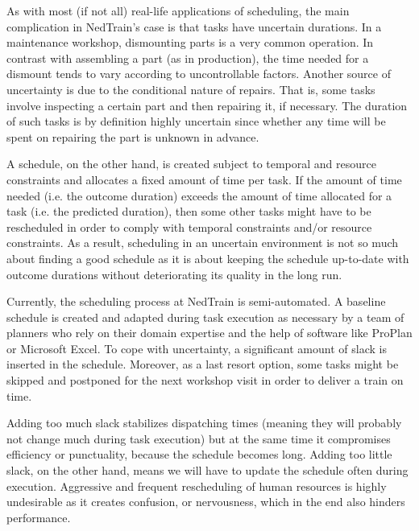 		As with most (if not all) real-life applications of scheduling,
		the main complication in NedTrain's case is that tasks have uncertain durations.
		In a maintenance workshop, dismounting parts is a very common operation.
		In contrast with assembling a part (as in production), the time needed for a dismount tends to vary according to uncontrollable factors.
		Another source of uncertainty is due to the conditional nature of repairs.
		That is, some tasks involve inspecting a certain part and then repairing it, if necessary.
		The duration of such tasks is by definition highly uncertain since whether 
		any time will be spent on repairing the part is unknown in advance.

		A schedule, on the other hand, is created subject to temporal and resource constraints and allocates a fixed amount of time per task.
		If the amount of time needed (i.e. the outcome duration) exceeds the amount of time allocated for a task (i.e. the predicted duration),
		then some other tasks might have to be rescheduled in order to comply with temporal constraints and/or resource constraints.
		As a result, scheduling in an uncertain environment is not so much about finding a good schedule 
		as it is about keeping the schedule up-to-date with outcome durations without deteriorating its quality in the long run.

		Currently, the scheduling process at NedTrain is semi-automated.
		A baseline schedule is created and adapted during task execution as necessary by a team of 
		planners who rely on their domain expertise and the help of software like ProPlan or Microsoft Excel.
		To cope with uncertainty, a significant amount of slack is inserted in the schedule.
		Moreover, as a last resort option, some tasks might be skipped and postponed for the next workshop visit in order to deliver a train on time.

		Adding too much slack stabilizes dispatching times (meaning they will probably not change much during task execution) 
		but at the same time it compromises efficiency or punctuality, because the schedule becomes long.
		Adding too little slack, on the other hand, means we will have to update the schedule often during execution.
		Aggressive and frequent rescheduling of human resources is highly undesirable as it creates confusion, or nervousness, 
		which in the end also hinders performance.
	

